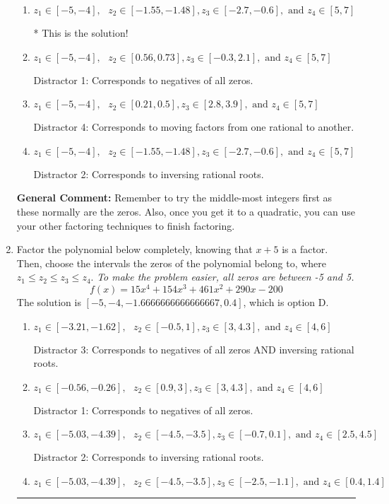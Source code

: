 \documentclass{extbook}[14pt]
\newcommand{\litem}[1]{\item #1

\rule{\textwidth}{0.4pt}}
\begin{document}
\begin{enumerate}
{\begin{enumerate}[label=\Alph*.]
 Distractor 3: Corresponds to negatives of all zeros AND inversing rational roots.
\item \( z_1 \in [-5, -4], \text{   }  z_2 \in [-1.55, -1.48], z_3 \in [-2.7, -0.6], \text{   and   } z_4 \in [5, 7] \)

* This is the solution!
\item \( z_1 \in [-5, -4], \text{   }  z_2 \in [0.56, 0.73], z_3 \in [-0.3, 2.1], \text{   and   } z_4 \in [5, 7] \)

 Distractor 1: Corresponds to negatives of all zeros.
\item \( z_1 \in [-5, -4], \text{   }  z_2 \in [0.21, 0.5], z_3 \in [2.8, 3.9], \text{   and   } z_4 \in [5, 7] \)

 Distractor 4: Corresponds to moving factors from one rational to another.
\item \( z_1 \in [-5, -4], \text{   }  z_2 \in [-1.55, -1.48], z_3 \in [-2.7, -0.6], \text{   and   } z_4 \in [5, 7] \)

 Distractor 2: Corresponds to inversing rational roots.
\end{enumerate}

\textbf{General Comment:} Remember to try the middle-most integers first as these normally are the zeros. Also, once you get it to a quadratic, you can use your other factoring techniques to finish factoring.
}
\litem{
Factor the polynomial below completely, knowing that $x+5$ is a factor. Then, choose the intervals the zeros of the polynomial belong to, where $z_1 \leq z_2 \leq z_3 \leq z_4$. \textit{To make the problem easier, all zeros are between -5 and 5.}
\[ f(x) = 15x^{4} +154 x^{3} +461 x^{2} +290 x -200 \]The solution is \( [-5, -4, -1.6666666666666667, 0.4] \), which is option D.\begin{enumerate}[label=\Alph*.]
\item \( z_1 \in [-3.21, -1.62], \text{   }  z_2 \in [-0.5, 1], z_3 \in [3, 4.3], \text{   and   } z_4 \in [4, 6] \)

 Distractor 3: Corresponds to negatives of all zeros AND inversing rational roots.
\item \( z_1 \in [-0.56, -0.26], \text{   }  z_2 \in [0.9, 3], z_3 \in [3, 4.3], \text{   and   } z_4 \in [4, 6] \)

 Distractor 1: Corresponds to negatives of all zeros.
\item \( z_1 \in [-5.03, -4.39], \text{   }  z_2 \in [-4.5, -3.5], z_3 \in [-0.7, 0.1], \text{   and   } z_4 \in [2.5, 4.5] \)

 Distractor 2: Corresponds to inversing rational roots.
\item \( z_1 \in [-5.03, -4.39], \text{   }  z_2 \in [-4.5, -3.5], z_3 \in [-2.5, -1.1], \text{   and   } z_4 \in [0.4, 1.4] \)


\end{enumerate}}
\end{enumerate}
\end{document}
